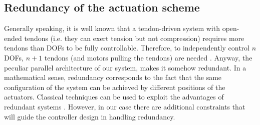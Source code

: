 \documentclass[conference]{IEEEtran}
\numberwithin{equation}{section}
\begin{document}
\subsection{Redundancy of the actuation scheme}

Generally speaking, it is well known that a tendon-driven system with open-ended tendons (i.e. they can exert tension but not compression) requires more tendons than DOFs to be fully controllable. Therefore, to independently control $n$ DOFs, $n+1$ tendons (and motors pulling the tendons) are needed \cite{Tsai}. 
Anyway, the peculiar parallel architecture of our system, makes it somehow redundant.
In a mathematical sense, redundancy corresponds to the fact that the same configuration of the system can be achieved by different positions of the actuators. Classical techniques can be used to exploit the advantages of redundant systems \cite{SamsonEspiau}. However, in our case there are additional constraints that will guide the controller design in handling redundancy. 
\end{document}

